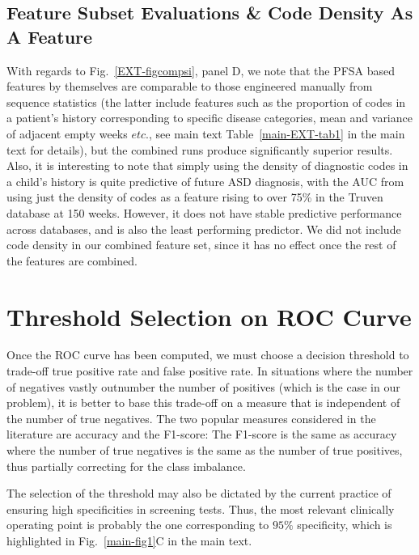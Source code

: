 \documentclass[3p,super,numbers,sort&compress,preprint,10pt]{elsarticle}
\begin{document}
\subsection{Feature Subset Evaluations \& Code Density As A Feature}\label{subsec:features}
With regards to Fig.~\ref{EXT-figcompsi}, panel D, we note that the PFSA based features by themselves are comparable to those engineered manually from sequence statistics (the latter include  features such as the proportion of  codes in a patient's history corresponding to specific  disease categories, mean and variance of adjacent empty weeks $etc.$, see main text Table~\ref{main-EXT-tab1} in the main text for details), but the combined runs produce significantly superior results.
Also, it is interesting to note that simply using the density of diagnostic codes in a child's history is quite predictive of future ASD diagnosis, with the AUC from using just the density of codes as a feature rising to over 75\% in the Truven database at 150 weeks. However, it does not have stable predictive performance across databases, and is also the least performing predictor. We did not include code density in our combined feature set, since it has no effect once the rest of the features are combined.

\section{Threshold Selection on ROC Curve}\label{sec:F1}
Once the ROC curve has been computed, we must choose a decision threshold to trade-off true positive rate and false positive rate.
In situations where the number of negatives vastly outnumber the number of positives (which is the case in our problem), it is better to base this trade-off on a measure that is independent of the number of true negatives. The two popular measures considered in the literature  are accuracy and the F1-score:
The F1-score is the same as accuracy where  the number of true negatives is the same as the number of true positives, thus partially correcting for the class imbalance.

The selection of the threshold may also be dictated by the current practice of ensuring high specificities in screening tests. Thus, the most relevant clinically  operating point  is probably the one corresponding to $95\%$ specificity, which is highlighted in Fig.~\ref{main-fig1}C in the main text.
\end{document}
